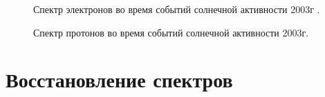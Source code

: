 \documentclass{config}
\begin{document}
\begin{figure}[h]
\begin{minipage}[h]{0.5\linewidth}
\caption{Спектр электронов во время событий солнечной активности 2003г \cite{real_energy_spectrum}.}
\label{electrons_real_spectrum}
\end{minipage}
\hfill
\begin{minipage}[h]{0.5\linewidth}
\caption{Спектр протонов во время событий солнечной активности 2003г.}
\label{protons_real_specrtum}
\end{minipage}
\end{figure}


\clearpage

\section{Восстановление спектров}
\end{document}
